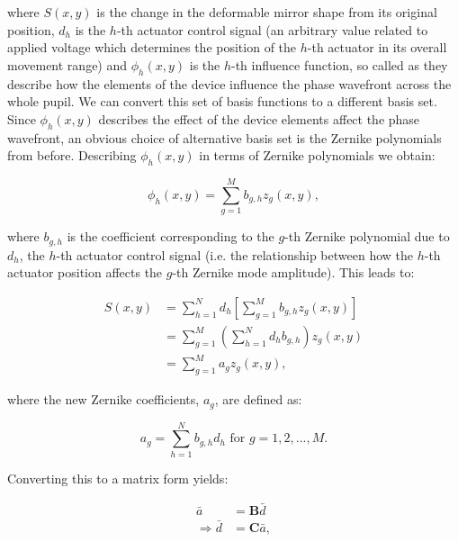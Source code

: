 where $S(x,y)$ is the change in the deformable mirror shape from its
original position, $d_h$ is the $h$-th actuator control signal
(an arbitrary value related to applied voltage which
determines the position of the $h$-th actuator in its overall
movement range) and $\phi_{h}(x,y)$ is the $h$-th influence
function, so called as they describe how the elements 
of the device influence the phase wavefront across the whole pupil. 
We can convert this set of basis functions to a different basis set. 
Since $\phi_{h}(x,y)$ describes the effect of the device elements affect
the phase wavefront, an obvious choice of alternative basis set is
the Zernike polynomials from before. Describing $\phi_{h}(x,y)$ in 
terms of Zernike polynomials we obtain:

\begin{equation}\label{eq:influence_to_zernike}
\phi_{h}(x,y) = \sum_{g=1}^{M} b_{g,h}z_{g}(x,y),
\end{equation}

where $b_{g,h}$ is the coefficient corresponding to the $g$-th
Zernike polynomial due to $d_h$, the $h$-th actuator control
signal (i.e. the relationship between how the $h$-th actuator 
position affects the $g$-th Zernike mode amplitude). This leads to:

\begin{equation}\label{eq:zernike_sub}
\begin{split}
S(x,y) & = \sum_{h=1}^{N} d_{h}\left[\sum_{g=1}^{M} b_{g,h}z_{g}(x,y)\right] \\
& =\sum_{g=1}^{M} \left(\sum_{h=1}^{N} d_{h} b_{g,h}\right) z_{g}(x,y) \\
& =\sum_{g=1}^{M} a_{g} z_{g}(x,y),
\end{split}
\end{equation}

where the new Zernike coefficients, $a_{g}$, are defined as:

\begin{equation}\label{eq:new_z_coef}
a_{g} = \sum_{h=1}^{N} b_{g,h} d_{h} \text{~for~} g=1,2,...,M.
\end{equation}

Converting this to a matrix form yields:

\begin{equation}\label{eq:CM_derivation}
\begin{split}
\bar{a} &= \boldsymbol{B} \bar{d}\\
\Rightarrow \bar{d} &= \boldsymbol{C} \bar{a},
\end{split}
\end{equation}

